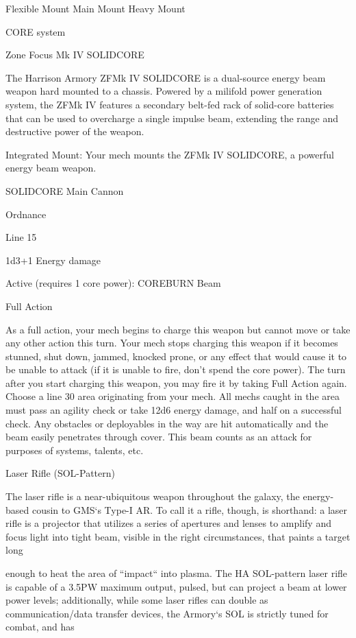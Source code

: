  Flexible Mount                    Main Mount                            Heavy Mount

                                               CORE system




                                       Zone Focus Mk IV  SOLIDCORE

 The Harrison Armory ZFMk IV SOLIDCORE is a dual-source energy beam weapon hard mounted to a
 chassis. Powered by a milifold power generation system, the ZFMk IV features a secondary belt-fed
 rack of solid-core batteries that can be used to overcharge a single impulse beam, extending the range
 and destructive power of the weapon.

  Integrated Mount: Your mech mounts the ZFMk IV SOLIDCORE, a powerful energy beam weapon.

 SOLIDCORE
  Main Cannon

 Ordnance

  Line 15

  1d3+1 Energy damage


 Active (requires 1 core power): COREBURN Beam

  Full Action

 As a full action, your mech begins to charge this weapon but cannot move or take any other action this
 turn. Your mech stops charging this weapon if it becomes stunned, shut down, jammed, knocked
  prone, or any effect that would cause it to be unable to attack (if it is unable to fire, don’t spend the
 core power). The turn after you start charging this weapon, you may fire it by taking Full Action again.
 Choose a line 30 area originating from your mech. All mechs caught in the area must pass an agility
 check or take 12d6 energy damage, and half on a successful check. Any obstacles or deployables in
 the way are hit automatically and the beam easily penetrates through cover. This beam counts as an
 attack for purposes of systems, talents, etc.

Laser Rifle (SOL-Pattern)

The laser rifle is a near-ubiquitous weapon throughout the galaxy, the energy-based cousin to GMS‘s Type-I
AR. To call it a rifle, though, is shorthand: a laser rifle is a projector that utilizes a series of apertures and
lenses to amplify and focus light into tight beam, visible in the right circumstances, that paints a target long

enough to heat the area of “impact“ into plasma. The HA SOL-pattern laser rifle is capable of a 3.5PW
maximum output, pulsed, but can project a beam at lower power levels; additionally, while some laser rifles
can double as communication/data transfer devices, the Armory‘s SOL is strictly tuned for combat, and has

